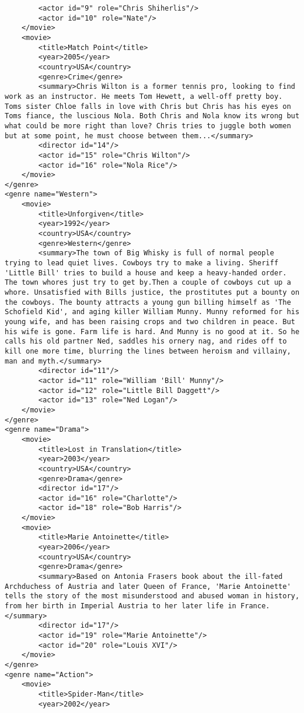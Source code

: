 \documentclass[a4paper, notitlepage]{article}
\begin{document}
\begin{enumerate}
\begin{lstlisting}
		<actor id="9" role="Chris Shiherlis"/>
		<actor id="10" role="Nate"/>
	</movie>
	<movie>
		<title>Match Point</title>
		<year>2005</year>
		<country>USA</country>
		<genre>Crime</genre>
		<summary>Chris Wilton is a former tennis pro, looking to find work as an instructor. He meets Tom Hewett, a well-off pretty boy. Toms sister Chloe falls in love with Chris but Chris has his eyes on Toms fiance, the luscious Nola. Both Chris and Nola know its wrong but what could be more right than love? Chris tries to juggle both women but at some point, he must choose between them...</summary>
		<director id="14"/>
		<actor id="15" role="Chris Wilton"/>
		<actor id="16" role="Nola Rice"/>
	</movie>
</genre>
<genre name="Western">
	<movie>
		<title>Unforgiven</title>
		<year>1992</year>
		<country>USA</country>
		<genre>Western</genre>
		<summary>The town of Big Whisky is full of normal people trying to lead quiet lives. Cowboys try to make a living. Sheriff 'Little Bill' tries to build a house and keep a heavy-handed order. The town whores just try to get by.Then a couple of cowboys cut up a whore. Unsatisfied with Bills justice, the prostitutes put a bounty on the cowboys. The bounty attracts a young gun billing himself as 'The Schofield Kid', and aging killer William Munny. Munny reformed for his young wife, and has been raising crops and two children in peace. But his wife is gone. Farm life is hard. And Munny is no good at it. So he calls his old partner Ned, saddles his ornery nag, and rides off to kill one more time, blurring the lines between heroism and villainy, man and myth.</summary>
		<director id="11"/>
		<actor id="11" role="William 'Bill' Munny"/>
		<actor id="12" role="Little Bill Daggett"/>
		<actor id="13" role="Ned Logan"/>
	</movie>
</genre>
<genre name="Drama">
	<movie>
		<title>Lost in Translation</title>
		<year>2003</year>
		<country>USA</country>
		<genre>Drama</genre>
		<director id="17"/>
		<actor id="16" role="Charlotte"/>
		<actor id="18" role="Bob Harris"/>
	</movie>
	<movie>
		<title>Marie Antoinette</title>
		<year>2006</year>
		<country>USA</country>
		<genre>Drama</genre>
		<summary>Based on Antonia Frasers book about the ill-fated Archduchess of Austria and later Queen of France, 'Marie Antoinette' tells the story of the most misunderstood and abused woman in history, from her birth in Imperial Austria to her later life in France. </summary>
		<director id="17"/>
		<actor id="19" role="Marie Antoinette"/>
		<actor id="20" role="Louis XVI"/>
	</movie>
</genre>
<genre name="Action">
	<movie>
		<title>Spider-Man</title>
		<year>2002</year>

\end{lstlisting}
\end{enumerate}
\end{document}

